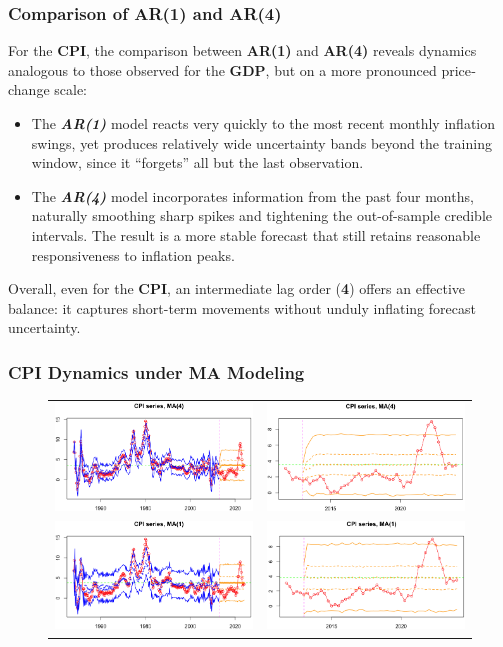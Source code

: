 \documentclass{Configuration_Files/PoliMi3i_thesis}
\begin{document}
\subsubsection*{Comparison of AR(1) and AR(4)}
For the \textbf{CPI}, the comparison between \textbf{AR(1)} and \textbf{AR(4)} reveals dynamics analogous to those observed for the \textbf{GDP}, but on a more pronounced price‐change scale:
\begin{itemize}
    \item The \textbf{\textit{AR(1)}} model reacts very quickly to the most recent monthly inflation swings, yet produces relatively wide uncertainty bands beyond the training window, since it “forgets” all but the last observation.
	\item The \textbf{\textit{AR(4)}} model incorporates information from the past four months, naturally smoothing sharp spikes and tightening the out-of-sample credible intervals. The result is a more stable forecast that still retains reasonable responsiveness to inflation peaks.
\end{itemize}


Overall, even for the \textbf{CPI}, an intermediate lag order (\textbf{4}) offers an effective balance: it captures short-term movements without unduly inflating forecast uncertainty.

\subsubsection{CPI Dynamics under MA Modeling}

\begin{figure}[H]
  \centering
  \begin{tabular}{@{}cc@{}}
    \includegraphics[angle=90,width=0.33\linewidth]{CPI_FMA(4).png} &
    \includegraphics[angle=90,width=0.33\linewidth]{CPI_ZMA(4).png} \\
    \includegraphics[angle=90,width=0.33\linewidth]{CPI_FMA(1).png} &
    \includegraphics[angle=90,width=0.335\linewidth]{CPI_ZMA(1).png}
  \end{tabular}
\end{figure}
\newpage
\end{document}
